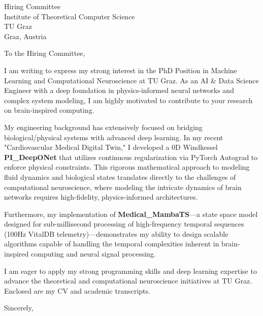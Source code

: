 \documentclass[11pt,a4paper]{letter}
\begin{document}
\begin{letter}{
    Hiring Committee \\
    Institute of Theoretical Computer Science \\
    TU Graz \\
    Graz, Austria
}
\opening{To the Hiring Committee,}

I am writing to express my strong interest in the PhD Position in Machine Learning and Computational Neuroscience at TU Graz. As an AI \& Data Science Engineer with a deep foundation in physics-informed neural networks and complex system modeling, I am highly motivated to contribute to your research on brain-inspired computing.

My engineering background has extensively focused on bridging biological/physical systems with advanced deep learning. In my recent "Cardiovascular Medical Digital Twin," I developed a 0D Windkessel \textbf{PI\_DeepONet} that utilizes continuous regularization via PyTorch Autograd to enforce physical constraints. This rigorous mathematical approach to modeling fluid dynamics and biological states translates directly to the challenges of computational neuroscience, where modeling the intricate dynamics of brain networks requires high-fidelity, physics-informed architectures.

Furthermore, my implementation of \textbf{Medical\_MambaTS}—a state space model designed for sub-millisecond processing of high-frequency temporal sequences (100Hz VitalDB telemetry)—demonstrates my ability to design scalable algorithms capable of handling the temporal complexities inherent in brain-inspired computing and neural signal processing.

I am eager to apply my strong programming skills and deep learning expertise to advance the theoretical and computational neuroscience initiatives at TU Graz. Enclosed are my CV and academic transcripts.

\closing{Sincerely,}
\end{letter}
\end{document}
